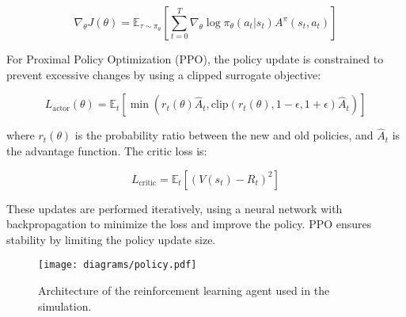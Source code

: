 \documentclass[11pt]{article}
\begin{document}
    \[
        \nabla_\theta J(\theta) = \mathbb{E}_{\tau \sim \pi_\theta} \left[ \sum_{t=0}^{T} \nabla_\theta \log \pi_\theta(a_t | s_t) A^\pi(s_t, a_t) \right]
    \]

    For Proximal Policy Optimization (PPO), the policy update is constrained to prevent excessive changes by using a clipped surrogate objective:

    \[
        L_{\text{actor}}(\theta) = \mathbb{E}_t \left[ \min \left( r_t(\theta) \hat{A}_t, \text{clip}(r_t(\theta), 1-\epsilon, 1+\epsilon) \hat{A}_t \right) \right]
    \]

    where \( r_t(\theta) \) is the probability ratio between the new and old policies, and \( \hat{A}_t \) is the advantage function.
    The critic loss is:

    \[
        L_{\text{critic}} = \mathbb{E}_t \left[ (V(s_t) - R_t)^2 \right]
    \]

    These updates are performed iteratively, using a neural network with backpropagation to minimize the loss and improve the policy.
    PPO ensures stability by limiting the policy update size.

    \begin{figure}[htb]
        \centering
        \texttt{[image: diagrams/policy.pdf]}
        \caption{Architecture of the reinforcement learning agent used in the simulation.}
        \label{fig:agent}
    \end{figure}
\end{document}

